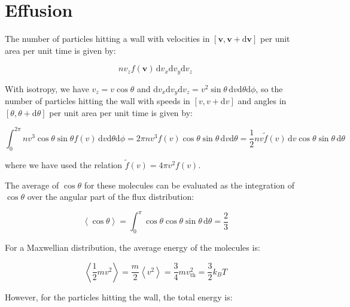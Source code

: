\documentclass[12pt]{article}
\begin{document}
\section*{Effusion}



The number of particles hitting a wall with velocities in $[\mathbf{v}, \mathbf{v} + \mathrm{d}\mathbf{v}]$ per unit area per unit time is given by:

\begin{equation}
    nv_{z} f(\mathbf{v}) \, \mathrm{d}v_{x} \mathrm{d}v_{y} \mathrm{d}v_{z}
\end{equation}

With isotropy, we have $v_{z} = v\cos{\theta}$ and $\mathrm{d}v_{x} \mathrm{d}v_{y} \mathrm{d}v_{z} = v^{2} \sin{\theta} \, \mathrm{d}v \mathrm{d}\theta \mathrm{d}\phi$, so the number of particles hitting the wall with speeds in $[v, v + \mathrm{d}v]$ and angles in $[\theta, \theta + \mathrm{d}\theta]$ per unit area per unit time is given by:

\begin{equation}
    \int_{0}^{2\pi} nv^{3} \cos{\theta} \sin{\theta} f(v) \, \mathrm{d}v \mathrm{d}\theta \mathrm{d}\phi = 2\pi nv^{3} f(v) \cos{\theta} \sin{\theta} \, \mathrm{d}v \mathrm{d}\theta = \frac{1}{2} nv \tilde{f}(v) \, \mathrm{d}v \cos{\theta} \sin{\theta} \, \mathrm{d}\theta
\end{equation}

where we have used the relation $\tilde{f}(v) = 4\pi v^{2} f(v)$.

The average of $\cos{\theta}$ for these molecules can be evaluated as the integration of $\cos{\theta}$ over the angular part of the flux distribution:

\begin{equation}
    \left\langle \cos{\theta} \right\rangle = \int_{0}^{\pi} \cos{\theta} \cos{\theta} \sin{\theta} \, \mathrm{d}\theta = \frac{2}{3}
\end{equation}

For a Maxwellian distribution, the average energy of the molecules is:

\begin{equation}
    \left\langle \frac{1}{2} m v^{2} \right\rangle = \frac{m}{2} \left\langle v^{2} \right\rangle = \frac{3}{4} m v_{\text{th}}^{2} = \frac{3}{2} k_{B} T
\end{equation}

However, for the particles hitting the wall, the total energy is:
\end{document}
